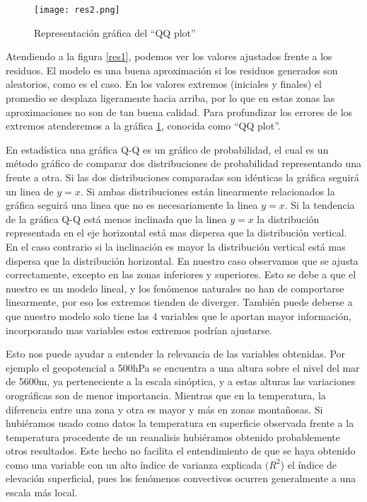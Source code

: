 \documentclass[12pt]{article}
\begin{document}
\begin{figure}[h]
\centering
    \texttt{[image: res2.png]}
    \caption[``QQ plot'']{Representación gráfica del ``QQ plot''} \label{res2}
\end{figure}

  
Atendiendo a la figura \ref{res1}, podemos ver los valores ajustados frente a los residuos. El modelo es una buena aproximación si los residuos generados son aleatorios, como es el caso. En los valores extremos (iniciales y finales) el promedio se desplaza ligeramente hacia arriba, por lo que en estas zonas las aproximaciones no son de tan buena calidad. Para profundizar los errores de los extremos atenderemos a la gráfica \ref{res2}, conocida como  ``QQ plot''.


En estadística una gráfica Q-Q es un gráfico de probabilidad, el cual es un método gráfico de comparar dos distribuciones de probabilidad representando una frente a otra. 
Si las dos distribuciones comparadas son idénticas la gráfica seguirá un linea de  $y=x$. Si ambas distribuciones están linearmente relacionados la gráfica seguirá una linea que no es necesariamente la linea $y=x$.  Si la tendencia de la gráfica Q-Q está menos inclinada que la linea  $y=x$ la distribución representada  en el eje horizontal está mas dispersa que la distribución vertical. En el caso contrario si la inclinación es mayor la distribución vertical está mas dispersa que la distribución horizontal. En nuestro caso observamos que se ajusta correctamente, excepto en las zonas inferiores y superiores. Esto se debe a que  el nuestro es un modelo lineal, y los fenómenos naturales no han de comportarse linearmente, por eso  los extremos tienden de diverger. También puede deberse a que nuestro modelo solo tiene las 4 variables que le aportan mayor información, incorporando mas variables estos extremos podrían  ajustarse.



Esto nos puede ayudar a entender la relevancia de las variables obtenidas. Por ejemplo el geopotencial a 500hPa se encuentra a una altura sobre el nivel del mar de 5600m, ya perteneciente a la escala sinóptica, y  a estas alturas las variaciones orográficas son  de menor importancia. Mientras que en la temperatura, la diferencia entre una zona y otra es mayor y más en zonas montañosas. Si hubiéramos usado como datos la temperatura en superficie observada frente a la temperatura procedente de un reanalisis hubiéramos obtenido probablemente otros resultados. Este hecho no facilita el entendimiento de que se haya obtenido como una variable con un alto índice de varianza explicada $(R^2$) el índice de elevación superficial, pues los fenómenos convectivos ocurren generalmente a una escala más local. 
\end{document}
